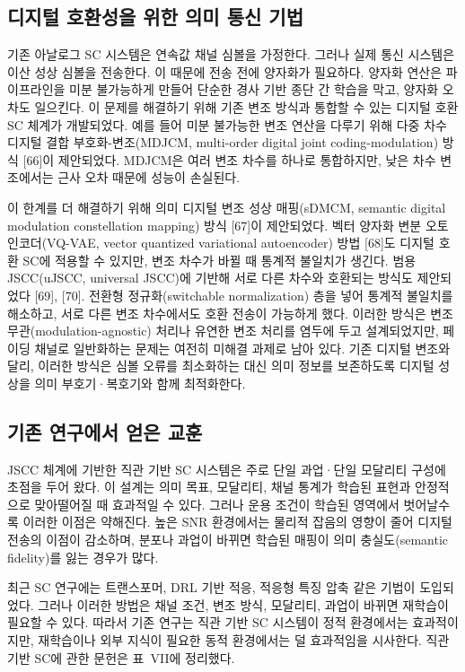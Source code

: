 \subsection{디지털 호환성을 위한 의미 통신 기법}

기존 아날로그 SC 시스템은 연속값 채널 심볼을 가정한다. 그러나 실제 통신 시스템은 이산 성상 심볼을 전송한다.
이 때문에 전송 전에 양자화가 필요하다.
양자화 연산은 파이프라인을 미분 불가능하게 만들어 단순한 경사 기반 종단 간 학습을 막고, 양자화 오차도 일으킨다.
이 문제를 해결하기 위해 기존 변조 방식과 통합할 수 있는 디지털 호환 SC 체계가 개발되었다.
예를 들어 미분 불가능한 변조 연산을 다루기 위해 다중 차수 디지털 결합 부호화-변조(MDJCM, multi-order digital joint coding-modulation) 방식 [66]이 제안되었다.
MDJCM은 여러 변조 차수를 하나로 통합하지만, 낮은 차수 변조에서는 근사 오차 때문에 성능이 손실된다.

이 한계를 더 해결하기 위해 의미 디지털 변조 성상 매핑(sDMCM, semantic digital modulation constellation mapping) 방식 [67]이 제안되었다.
벡터 양자화 변분 오토인코더(VQ-VAE, vector quantized variational autoencoder) 방법 [68]도 디지털 호환 SC에 적용할 수 있지만, 변조 차수가 바뀔 때 통계적 불일치가 생긴다.
범용 JSCC(uJSCC, universal JSCC)에 기반해 서로 다른 차수와 호환되는 방식도 제안되었다 [69], [70].
전환형 정규화(switchable normalization) 층을 넣어 통계적 불일치를 해소하고, 서로 다른 변조 차수에서도 호환 전송이 가능하게 했다.
이러한 방식은 변조 무관(modulation-agnostic) 처리나 유연한 변조 처리를 염두에 두고 설계되었지만, 페이딩 채널로 일반화하는 문제는 여전히 미해결 과제로 남아 있다.
기존 디지털 변조와 달리, 이러한 방식은 심볼 오류를 최소화하는 대신 의미 정보를 보존하도록 디지털 성상을 의미 부호기·복호기와 함께 최적화한다.

\subsection{기존 연구에서 얻은 교훈}

JSCC 체계에 기반한 직관 기반 SC 시스템은 주로 단일 과업·단일 모달리티 구성에 초점을 두어 왔다.
이 설계는 의미 목표, 모달리티, 채널 통계가 학습된 표현과 안정적으로 맞아떨어질 때 효과적일 수 있다.
그러나 운용 조건이 학습된 영역에서 벗어날수록 이러한 이점은 약해진다.
높은 SNR 환경에서는 물리적 잡음의 영향이 줄어 디지털 전송의 이점이 감소하며, 분포나 과업이 바뀌면 학습된 매핑이 의미 충실도(semantic fidelity)를 잃는 경우가 많다.

최근 SC 연구에는 트랜스포머, DRL 기반 적응, 적응형 특징 압축 같은 기법이 도입되었다.
그러나 이러한 방법은 채널 조건, 변조 방식, 모달리티, 과업이 바뀌면 재학습이 필요할 수 있다.
따라서 기존 연구는 직관 기반 SC 시스템이 정적 환경에서는 효과적이지만, 재학습이나 외부 지식이 필요한 동적 환경에서는 덜 효과적임을 시사한다.
직관 기반 SC에 관한 문헌은 표~VII에 정리했다.

